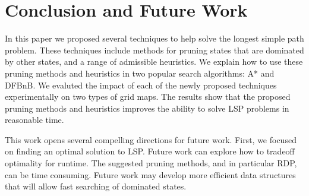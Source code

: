 \documentclass[letterpaper]{article} %
\begin{document}
\section{Conclusion and Future Work}

In this paper we proposed several techniques to help solve the longest simple path problem. These techniques include
methods for pruning states that are dominated by other states, and a range of admissible heuristics. We explain how to use these pruning methods and heuristics in two popular search algorithms: A* and DFBnB.
We evaluted the impact of each of the newly proposed techniques experimentally on two types of grid maps. The results show that the proposed pruning methods and heuristics improves the ability to solve LSP problems in reasonable time.

This work opens several compelling directions for future work. First, we focused on finding an optimal solution to LSP. Future work can explore how to tradeoff optimality for runtime.
The suggested pruning methods, and in particular RDP, can be time consuming. Future work may develop more efficient data structures that will allow fast searching of dominated states. %
\end{document}
